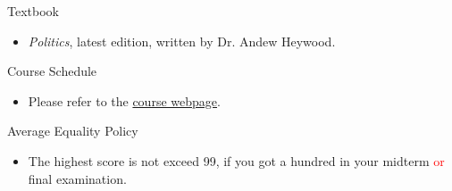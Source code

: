 \documentclass{article}
\begin{document}
Textbook \\
\begin{itemize}
\item \textit{Politics}, latest edition, written by Dr. Andew Heywood. \\
\end{itemize}
Course Schedule \\
\begin{itemize}
\item Please refer to the \href{https://politics-tchsiao.github.io/politics/}{course webpage}. \\
\end{itemize}
Average Equality Policy \\
\begin{itemize}
\item The highest score is not exceed 99, if you got a hundred in your midterm \textcolor{red}{or} final examination. \\
\end{itemize}
\end{document}
